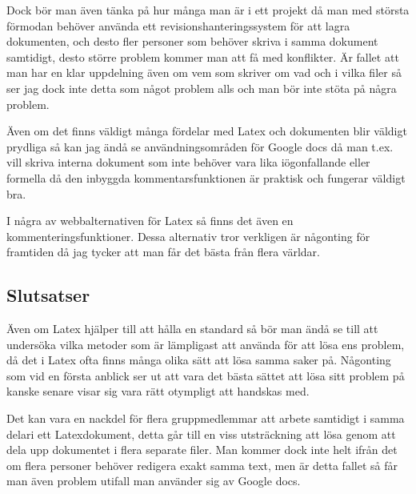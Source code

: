 Dock bör man även tänka på hur många man är i ett projekt då man med största förmodan behöver använda ett revisionshanteringssystem för att lagra dokumenten, och desto fler personer som behöver skriva i samma dokument samtidigt, desto större problem kommer man att få med konflikter. Är fallet att man har en klar uppdelning även om vem som skriver om vad och i vilka filer så ser jag dock inte detta som något problem alls och man bör inte stöta på några problem.


Även om det finns väldigt många fördelar med Latex och dokumenten blir väldigt prydliga så kan jag ändå se användningsområden för Google docs då man t.ex. vill skriva interna dokument som inte behöver vara lika iögonfallande eller formella då den inbyggda kommentarsfunktionen är praktisk och fungerar väldigt bra.

I några av webbalternativen för Latex så finns det även en kommenteringsfunktioner. Dessa alternativ tror verkligen är någonting för framtiden då jag tycker att man får det bästa från flera världar.


\subsection{Slutsatser}
Även om Latex hjälper till att hålla en standard så bör man ändå se till att undersöka vilka metoder som är lämpligast att använda för att lösa ens problem, då det i Latex ofta finns många olika sätt att lösa samma saker på. Någonting som vid en första anblick ser ut att vara det bästa sättet att lösa sitt problem på kanske senare visar sig vara rätt otympligt att handskas med.

Det kan vara en nackdel för flera gruppmedlemmar att arbete samtidigt i samma delari ett Latexdokument, detta går till en viss utsträckning att lösa genom att dela upp dokumentet i flera separate filer. Man kommer dock inte helt ifrån det om flera personer behöver redigera exakt samma text, men är detta fallet så får man även problem utifall man använder sig av Google docs.

